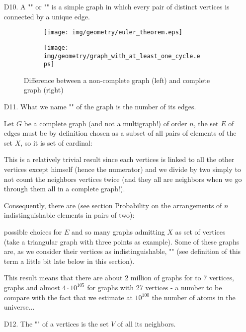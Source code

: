 {\begin{enumerate}
	\item[D10.] A ""  or "" is a simple graph in which every pair of distinct vertices is connected by a unique edge.
	\begin{figure}[H]
		\centering
		\begin{subfigure}{0.4\textwidth}
			\texttt{[image: img/geometry/euler\_theorem.eps]}
		\end{subfigure}
		\begin{subfigure}{0.4\textwidth}
			\texttt{[image: img/geometry/graph\_with\_at\_least\_one\_cycle.eps]}
		\end{subfigure}		
		\caption{Difference between a non-complete graph (left) and complete graph (right)}		
	\end{figure}
	
	\item[D11.] What we name "" of the graph is the number of its edges.
	
	Let $G$ be a complete graph (and not a multigraph!) of order $n$, the set $E$ of edges must be by definition chosen as a subset of all pairs of elements of the set $X$, so it is set of cardinal:
	
	This is a relatively trivial result since each vertices is linked to all the other vertices except himself (hence the numerator) and we divide by two simply to not count the neighbors vertices twice (and they all are neighbors when we go through them all in a complete graph!).
	
	Consequently, there are (see section Probability on the arrangements  of $n$ indistinguishable elements in pairs of two):
	
	possible choices for $E$ and so many graphs admitting $X$ as set of vertices (take a triangular graph with three points as example). Some of these graphs are, as we consider their vertices as indistinguishable, "" (see definition of this term a little bit late below in this section).
	
	This result means that there are about 2 million of graphs for to 7 vertices, graphs and almost $4\cdot 10^{105}$ for graphs with 27 vertices - a number to be compare with the fact that we estimate at $10^{100}$ the number of atoms in the universe...
	
	\item[D12.] The "" of a vertices is the set $V$ of all its neighbors.
	

\end{enumerate}}

